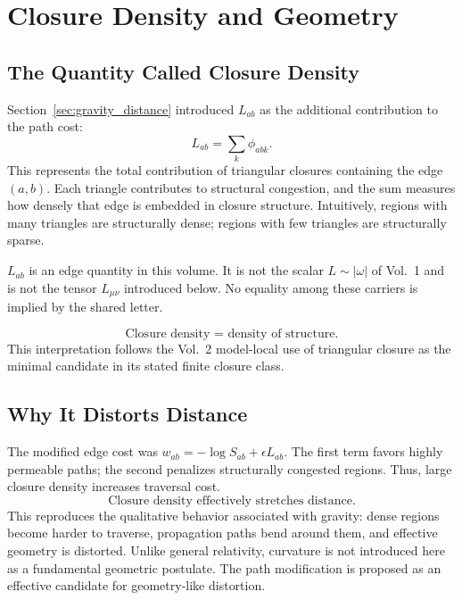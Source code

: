 \section{Closure Density and Geometry}
\label{sec:closure_density}

\subsection{The Quantity Called Closure Density}

Section~\ref{sec:gravity_distance} introduced $L_{ab}$ as the additional
contribution to the path cost:
\begin{equation}
  \boxed{L_{ab} = \sum_k \phi_{abk}.}
\end{equation}
This represents the total contribution of triangular closures containing
the edge $(a,b)$.
Each triangle contributes to structural congestion,
and the sum measures how densely that edge is embedded in closure structure.
Intuitively, regions with many triangles are structurally dense;
regions with few triangles are structurally sparse.

\begin{remark}
$L_{ab}$ is an edge quantity in this volume. It is not the scalar
$L\sim|\omega|$ of Vol.~1 and is not the tensor $L_{\mu\nu}$ introduced below.
No equality among these carriers is implied by the shared letter.
\end{remark}
\begin{equation}
  \boxed{\text{Closure density = density of structure.}}
\end{equation}
This interpretation follows the Vol.~2 model-local use of triangular closure
as the minimal candidate in its stated finite closure class.

\subsection{Why It Distorts Distance}

The modified edge cost was $w_{ab} = -\log S_{ab} + \epsilon L_{ab}$.
The first term favors highly permeable paths;
the second penalizes structurally congested regions.
Thus, large closure density increases traversal cost.
\begin{equation}
  \boxed{\text{Closure density effectively stretches distance.}}
\end{equation}
This reproduces the qualitative behavior associated with gravity:
dense regions become harder to traverse,
propagation paths bend around them,
and effective geometry is distorted.
Unlike general relativity, curvature is not introduced here as a fundamental
geometric postulate.  The path modification is proposed as an effective
candidate for geometry-like distortion.

